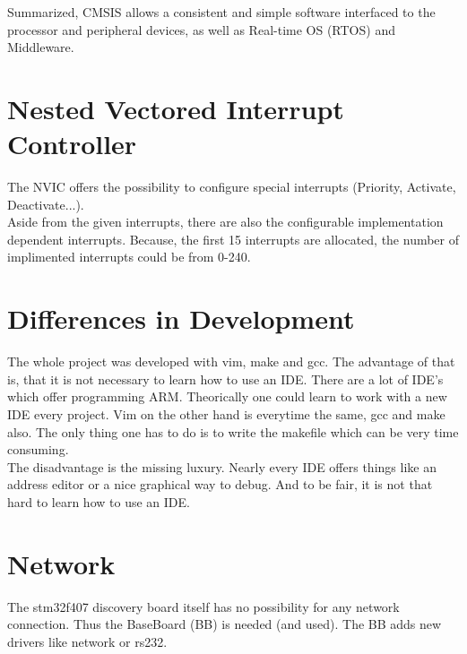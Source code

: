 Summarized, CMSIS allows a consistent and simple software interfaced to the processor 
and peripheral devices, as well as Real-time OS (RTOS) and Middleware.

\section{Nested Vectored Interrupt Controller}
The NVIC offers the possibility to configure special interrupts 
(Priority, Activate, Deactivate...). \\
Aside from the given interrupts, there are also the configurable implementation dependent interrupts.  
Because, the first 15 interrupts are allocated, the number of implimented interrupts could be from 0-240.

\section{Differences in Development}
The whole project was developed with vim, make and gcc.
 The advantage of that is, that it is not necessary to learn how to use an IDE.
 There are a lot of IDE's which offer programming ARM. Theorically one could 
learn to work with a new IDE every project. Vim on the other hand is everytime 
the same, gcc and make also. The only thing one has to do is to write the 
 makefile which can be very time consuming.\\
The disadvantage is the missing luxury. Nearly every IDE offers things like an
address editor or a nice graphical way to debug. And to be fair, it is not that
hard to learn how to use an IDE.

\section{Network}
The stm32f407 discovery board itself has no possibility for any network connection.
Thus the BaseBoard (BB) is needed (and used). The BB adds new drivers like network
or rs232.
